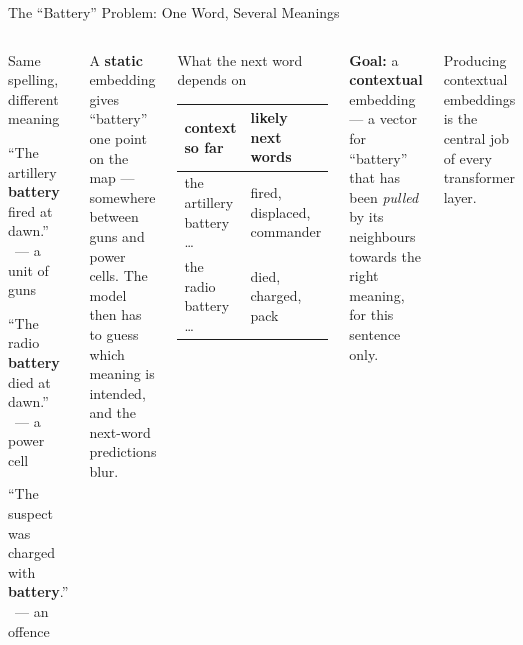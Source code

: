 \documentclass[aspectratio=169,10pt]{beamer}
\begin{document}
\begin{frame}{The ``Battery'' Problem: One Word, Several Meanings}
\begin{columns}[T]
\begin{cbox}{Same spelling, different meaning}\scriptsize
\begin{tl}
\item ``The artillery \textbf{battery} fired at dawn.'' \ --- a unit of guns
\item ``The radio \textbf{battery} died at dawn.'' \ --- a power cell
\item ``The suspect was charged with \textbf{battery}.'' \ --- an offence
\end{tl}
\end{cbox}
\begin{wbox}\scriptsize A \textbf{static} embedding gives ``battery'' one point on the map --- somewhere between guns and power cells. The model then has to guess which meaning is intended, and the next-word predictions blur.\end{wbox}
\begin{cbox}{What the next word depends on}\scriptsize
\centering\renewcommand{\arraystretch}{1.15}
\begin{tabular}{ll}
\toprule\textbf{context so far}&\textbf{likely next words}\\\midrule
the artillery battery \dots&fired, displaced, commander\\
the radio battery \dots&died, charged, pack\\\bottomrule
\end{tabular}
\end{cbox}
\begin{rbox}\scriptsize\textbf{Goal:} a \textbf{contextual} embedding --- a vector for ``battery'' that has been \emph{pulled} by its neighbours towards the right meaning, for this sentence only.\end{rbox}
\begin{ibox}\scriptsize Producing contextual embeddings is the central job of every transformer layer.\end{ibox}
\end{columns}
\end{frame}
\end{document}
